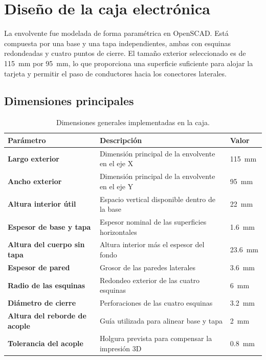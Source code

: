 \documentclass[11pt,a4paper]{article}
\begin{document}
\section{Diseño de la caja electrónica}

La envolvente fue modelada de forma paramétrica en OpenSCAD. Está compuesta por una
base y una tapa independientes, ambas con esquinas redondeadas y cuatro puntos de cierre.
El tamaño exterior seleccionado es de \SI{115}{\milli\metre} por \SI{95}{\milli\metre},
lo que proporciona una superficie suficiente para alojar la tarjeta y permitir el paso
de conductores hacia los conectores laterales.

\subsection{Dimensiones principales}

\begin{table}[H]
\centering
\caption{Dimensiones generales implementadas en la caja.}
\begin{tabularx}{0.96\textwidth}{>{\bfseries}p{5.4cm} X >{\raggedleft\arraybackslash}p{3.0cm}}
\toprule
Parámetro & Descripción & Valor \\
\midrule
Largo exterior & Dimensión principal de la envolvente en el eje X & \SI{115}{\milli\metre} \\
Ancho exterior & Dimensión principal de la envolvente en el eje Y & \SI{95}{\milli\metre} \\
Altura interior útil & Espacio vertical disponible dentro de la base & \SI{22}{\milli\metre} \\
Espesor de base y tapa & Espesor nominal de las superficies horizontales & \SI{1.6}{\milli\metre} \\
Altura del cuerpo sin tapa & Altura interior más el espesor del fondo & \SI{23.6}{\milli\metre} \\
Espesor de pared & Grosor de las paredes laterales & \SI{3.6}{\milli\metre} \\
Radio de las esquinas & Redondeo exterior de las cuatro esquinas & \SI{6}{\milli\metre} \\
Diámetro de cierre & Perforaciones de las cuatro esquinas & \SI{3.2}{\milli\metre} \\
Altura del reborde de acople & Guía utilizada para alinear base y tapa & \SI{2}{\milli\metre} \\
Tolerancia del acople & Holgura prevista para compensar la impresión 3D & \SI{0.8}{\milli\metre} \\
\bottomrule
\end{tabularx}
\end{table}
\end{document}
